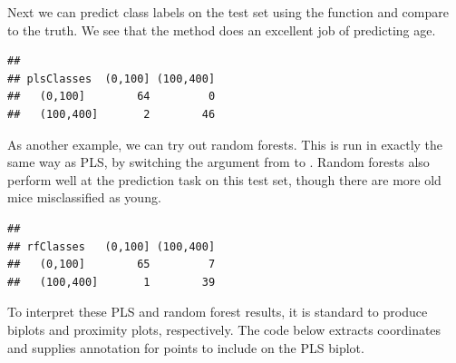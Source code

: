 Next we can predict class labels on the test set using the
 function and compare to the truth. We see that the
method does an excellent job of predicting age.
\begin{knitrout}
\color{fgcolor}\begin{kframe}
\begin{alltt}
 \hlkwb{<-}   
\hlopt{$}
\end{alltt}
\begin{verbatim}
##            
## plsClasses  (0,100] (100,400]
##   (0,100]        64         0
##   (100,400]       2        46
\end{verbatim}
\end{kframe}
\end{knitrout}

As another example, we can try out random forests. This is run in
exactly the same way as PLS, by switching the 
argument from  to . Random forests also
perform well at the prediction task  on this test set, though there
are more old mice misclassified as young.
\begin{knitrout}
\color{fgcolor}\begin{kframe}
\begin{alltt}
 \hlkwb{<-}  \hlopt{~}     \hlstd{=} \hlstd{,}
                \hlstd{=} \hlstd{,}  \hlstd{=} \hlstd{)}
 \hlkwb{<-}   
\hlopt{$}
\end{alltt}
\begin{verbatim}
##            
## rfClasses   (0,100] (100,400]
##   (0,100]        65         7
##   (100,400]       1        39
\end{verbatim}
\end{kframe}
\end{knitrout}

To interpret these PLS and random forest results, it is standard to
produce biplots and proximity plots, respectively. The code below
extracts coordinates and supplies annotation for points to include on
the PLS biplot.

